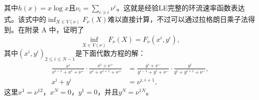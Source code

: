 其中$h(x) = x \log x$且$\nu_i=\sum_{c\ni i}\nu^c$。这就是经验LE完整的环流速率函数表达式。该式中的$\inf_{X\in V(\nu)}F_{\nu}(X)$难以直接计算，不过可以通过拉格朗日乘子法得到。在附录 A 中，证明了
\begin{equation*}
    \inf_{X\in V(\nu)}F_{\nu}(X) = F_{\nu}(x^i,y^i),
\end{equation*}
其中$(x^i,y^i)_{2\leq i\leq N-1}$是下面代数方程的解：
\begin{equation}\label{equation}
    \begin{split}
    \frac{x^{i}}{x^{i-1}+x^{i}+\nu^+}\cdot\frac{x^{i}+\nu^+}{x^{i}+x^{i+1}+\nu^+}
    &= \frac{y^{i}+\nu^-}{y^{i-1}+y^{i}+\nu^-}\cdot\frac{y^{i}}{y^{i}+y^{i+1}+\nu^-},\\
    x^{i} + y^{i} &= \nu^{i,i+1},
    \end{split}
\end{equation}
这里$x^1=\nu^{12}$，$x^N=0$，$y^1=0$，并且$y^N=\nu^{1N}$。

